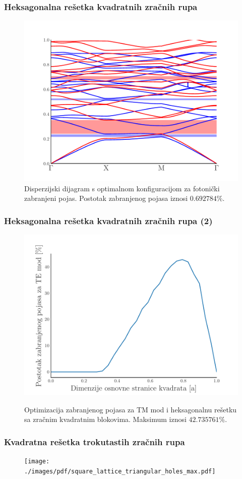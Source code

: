 \documentclass{beamer}
\begin{document}
\begin{frame}
	\frametitle{Heksagonalna rešetka kvadratnih zračnih rupa}
	\begin{figure}[ht]
		\centering
		\includegraphics[width=0.85\linewidth]
			{./images/pdf/triangular_lattice_squares_band_diag_max.pdf}
		\caption{Disperzijski dijagram s optimalnom konfiguracijom za fotonički
		zabranjeni pojas. Postotak zabranjenog pojasa iznosi $0.692784 \%$.}
		\label{fig:triangular_squares_optimization}
	\end{figure}
\end{frame}

\begin{frame}
	\frametitle{Heksagonalna rešetka kvadratnih zračnih rupa (2)}
	\begin{figure}[ht]
    	{\includegraphics[width=0.85\linewidth]
    		{./images/pdf/optimization_block_te.pdf}}%
		\caption{Optimizacija zabranjenog pojasa za TM mod i heksagonalnu rešetku
		sa zračnim kvadratnim blokovima. Maksimum iznosi $42.735761 \%$.}
		\label{fig:triangular_squares_te_optimization}
	\end{figure}
\end{frame}
\begin{frame}
	\frametitle{Kvadratna rešetka trokutastih zračnih rupa}
    \begin{figure}[ht]
        \centering
        \texttt{[image: ./images/pdf/square\_lattice\_triangular\_holes\_max.pdf]}
    \end{figure}
\end{frame}
\end{document}
